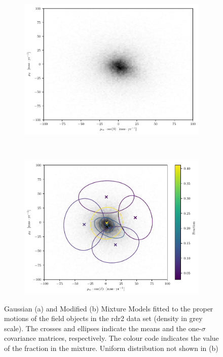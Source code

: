 \begin{figure}[ht!]
    \centering
    \begin{subfigure}[t]{0.8\textwidth}
        \includegraphics[page=3,width=\textwidth]{background/Figures/GMM-PM-BIC=15.pdf}
        \caption{}
        \label{fig:fpmGMM}
    \end{subfigure}
    \\
    \begin{subfigure}[t]{0.8\textwidth}
      \includegraphics[page=1,width=\textwidth]{background/Figures/GMM-PM-BIC2-U+7G.pdf}
        \caption{}
        \label{fig:fpmMMM} 
    \end{subfigure}
\caption{Gaussian (a) and Modified (b) Mixture Models fitted to the proper motions of the field objects in the \gls{rdr2} data set (density in grey scale). The crosses and ellipses indicate the means and the one-$\sigma$ covariance matrices, respectively. The colour code indicates the value of the fraction in the mixture. Uniform distribution not shown in (b)}
\label{fig:GMMvsMMM}
\end{figure}

